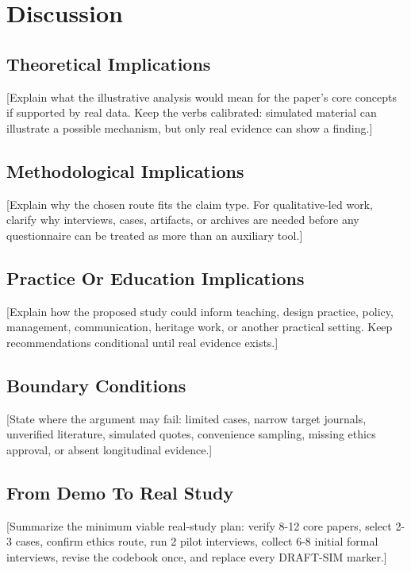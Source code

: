\section{Discussion}

\subsection{Theoretical Implications}

[Explain what the illustrative analysis would mean for the paper's core concepts if supported by real data. Keep the verbs calibrated: simulated material can illustrate a possible mechanism, but only real evidence can show a finding.]

\subsection{Methodological Implications}

[Explain why the chosen route fits the claim type. For qualitative-led work, clarify why interviews, cases, artifacts, or archives are needed before any questionnaire can be treated as more than an auxiliary tool.]

\subsection{Practice Or Education Implications}

[Explain how the proposed study could inform teaching, design practice, policy, management, communication, heritage work, or another practical setting. Keep recommendations conditional until real evidence exists.]

\subsection{Boundary Conditions}

[State where the argument may fail: limited cases, narrow target journals, unverified literature, simulated quotes, convenience sampling, missing ethics approval, or absent longitudinal evidence.]

\subsection{From Demo To Real Study}

[Summarize the minimum viable real-study plan: verify 8-12 core papers, select 2-3 cases, confirm ethics route, run 2 pilot interviews, collect 6-8 initial formal interviews, revise the codebook once, and replace every DRAFT-SIM marker.]
